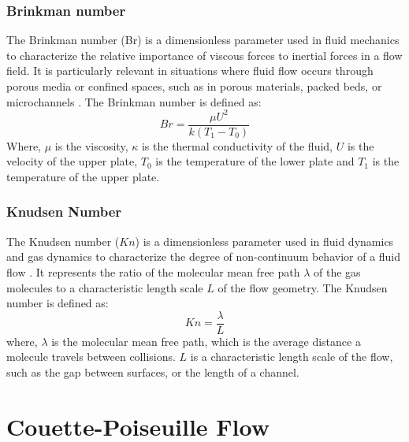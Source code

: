 \documentclass[14pt,one side, a4paper]{extbook}
\begin{document}
	 	\subsection{Brinkman number}
	 	 The Brinkman number (Br) is a dimensionless parameter used in fluid mechanics to characterize the relative importance of viscous forces to inertial forces in a flow field. It is particularly relevant in situations where fluid flow occurs through porous media or confined spaces, such as in porous materials, packed beds, or microchannels \cite{frank,rajputrk}. The Brinkman number is defined as:
	 	 $$Br=\frac{\mu U^{2}}{k (T_{1}-T_{0})}$$
	 	 Where, $\mu$ is the viscosity, $\kappa$ is the thermal conductivity of the fluid, $U$ is the velocity of the upper plate, $T_{0}$ is the temperature of the lower plate and $T_{1}$ is the temperature of the upper plate.
	 	\subsection{Knudsen Number}
	 	The Knudsen number ($Kn$) is a dimensionless parameter used in fluid dynamics and gas dynamics to characterize the degree of non-continuum behavior of a fluid flow \cite{frank,Shabbir}. It represents the ratio of the molecular mean free path $\lambda$ of the gas molecules to a characteristic length scale $L$ of the flow geometry. The Knudsen number is defined as:
	 		\begin{equation*}
	 			Kn=\frac{\lambda}{L}
	 		\end{equation*}
	 	where, $\lambda$ is the molecular mean free path, which is the average distance a molecule travels between collisions. $L$ is a characteristic length scale of the flow, such as the gap between surfaces, or the length of a channel.	
	 	\chapter{Couette-Poiseuille Flow}
\end{document}
